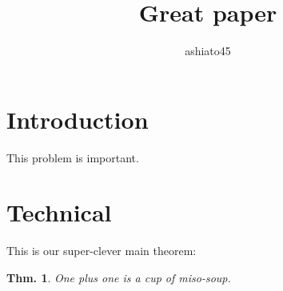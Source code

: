 \documentclass{article}
\title{Great paper}
\author{ashiato45}
\newtheorem{theorem}{Thm.}
\begin{document}
\maketitle

\section{Introduction}
This problem is important.

\section{Technical}
This is our super-clever main theorem:
\begin{theorem}
    One plus one is a cup of miso-soup.
\end{theorem}
\end{document}
